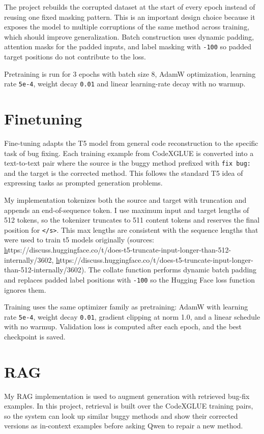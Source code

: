 \documentclass[11pt]{article}
\begin{document}
The project rebuilds the corrupted dataset at the start of every epoch instead of reusing one fixed masking pattern. This is an important design choice because it exposes the model to multiple corruptions of the same method across training, which should improve generalization. Batch construction uses dynamic padding, attention masks for the padded inputs, and label masking with \texttt{-100} so padded target positions do not contribute to the loss.

Pretraining is run for 3 epochs with batch size 8, AdamW optimization, learning rate \texttt{5e-4}, weight decay \texttt{0.01} and linear learning-rate decay with no warmup.

\section{Finetuning}
Fine-tuning adapts the T5 model from general code reconstruction to the specific task of bug fixing. Each training example from CodeXGLUE is converted into a text-to-text pair where the source is the buggy method prefixed with \texttt{fix bug:} and the target is the corrected method. This follows the standard T5 idea of expressing tasks as prompted generation problems.

My implementation tokenizes both the source and target with truncation and appends an end-of-sequence token. I use maximum input and target lengths of 512 tokens, so the tokenizer truncates to 511 content tokens and reserves the final position for \texttt{</s>}. This max lengths are consistent with the sequence lengths that were used to train t5 models originally (sources: \href{https://discuss.huggingface.co/t/does-t5-truncate-input-longer-than-512-internally/3602}https://discuss.huggingface.co/t/does-t5-truncate-input-longer-than-512-internally/3602, \href{https://discuss.huggingface.co/t/does-t5-truncate-input-longer-than-512-internally/3602}https://discuss.huggingface.co/t/does-t5-truncate-input-longer-than-512-internally/3602). The collate function performs dynamic batch padding and replaces padded label positions with \texttt{-100} so the Hugging Face loss function ignores them.

Training uses the same optimizer family as pretraining: AdamW with learning rate \texttt{5e-4}, weight decay \texttt{0.01}, gradient clipping at norm 1.0, and a linear schedule with no warmup. Validation loss is computed after each epoch, and the best checkpoint is saved. 

\section{RAG}
 My RAG implementation is used to augment generation with retrieved bug-fix examples. In this project, retrieval is built over the CodeXGLUE training pairs, so the system can look up similar buggy methods and show their corrected versions as in-context examples before asking Qwen to repair a new method.
\end{document}
